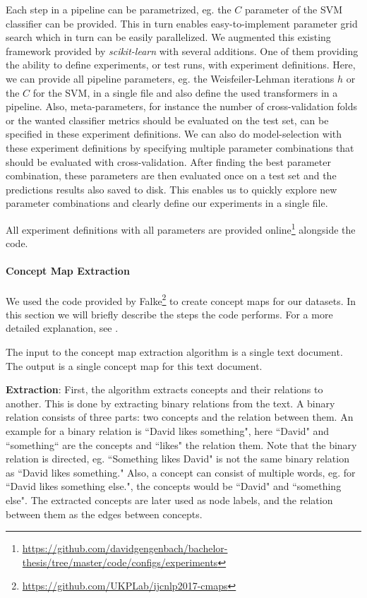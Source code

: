 Each step in a pipeline can be parametrized, eg. the $C$ parameter of the SVM classifier can be provided.
This in turn enables easy-to-implement parameter grid search which in turn can be easily parallelized.
We augmented this existing framework provided by \textit{scikit-learn} with several additions.
One of them providing the ability to define experiments, or test runs, with experiment definitions.
Here, we can provide all pipeline parameters, eg. the Weisfeiler-Lehman iterations $h$ or the $C$ for the SVM, in a single file and also define the used transformers in a pipeline.
Also, meta-parameters, for instance the number of cross-validation folds or the wanted classifier metrics should be evaluated on the test set, can be specified in these experiment definitions.
We can also do model-selection with these experiment definitions by specifying multiple parameter combinations that should be evaluated with cross-validation.
After finding the best parameter combination, these parameters are then evaluated once on a test set and the predictions results also saved to disk.
This enables us to quickly explore new parameter combinations and clearly define our experiments in a single file.

All experiment definitions with all parameters are provided online\footnote{\url{https://github.com/davidgengenbach/bachelor-thesis/tree/master/code/configs/experiments}} alongside the code.

\paragraph{Concept Map Extraction}
We used the code provided by Falke\footnote{\url{https://github.com/UKPLab/ijcnlp2017-cmaps}}  to create concept maps for our datasets.
In this section we will briefly describe the steps the code performs. For a more detailed explanation, see \cite{Falke2017}.

The input to the concept map extraction algorithm is a single text document. The output is a single concept map for this text document.

\textbf{Extraction}:
First, the algorithm extracts concepts and their relations to another.
This is done by extracting binary relations from the text. A binary relation consists of three parts: two concepts and the relation between them. An example for a binary relation is ``David likes something", here ``David" and ``something`` are the concepts and ``likes" the relation them. Note that the binary relation is directed, eg. ``Something likes David" is not the same binary relation as ``David likes something."
Also, a concept can consist of multiple words, eg. for ``David likes something else.", the concepts would be ``David" and ``something else".
The extracted concepts are later used as node labels, and the relation between them as the edges between concepts.

